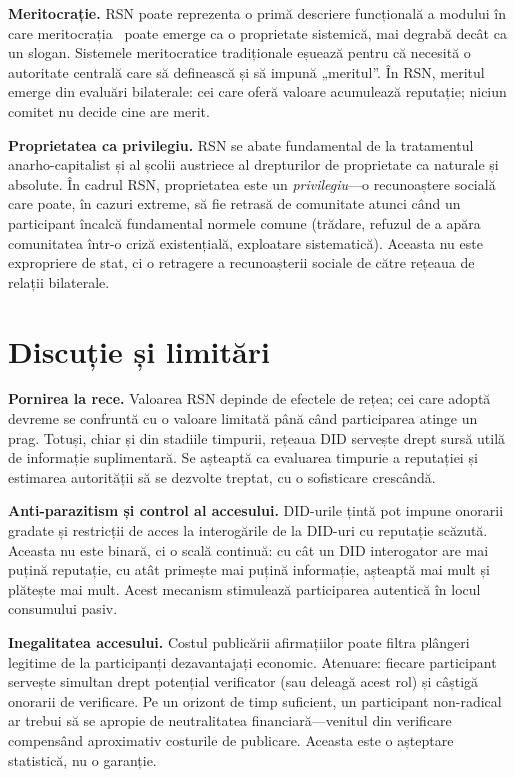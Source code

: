 \documentclass[11pt,a4paper,twocolumn]{article}
\begin{document}
\textbf{Meritocrație.} RSN poate reprezenta o primă descriere funcțională a modului în care meritocrația~\cite{young1958} poate emerge ca o proprietate sistemică, mai degrabă decât ca un slogan. Sistemele meritocratice tradiționale eșuează pentru că necesită o autoritate centrală care să definească și să impună „meritul”. În RSN, meritul emerge din evaluări bilaterale: cei care oferă valoare acumulează reputație; niciun comitet nu decide cine are merit.

\textbf{Proprietatea ca privilegiu.} RSN se abate fundamental de la tratamentul anarho-capitalist și al școlii austriece al drepturilor de proprietate ca naturale și absolute. În cadrul RSN, proprietatea este un \emph{privilegiu}---o recunoaștere socială care poate, în cazuri extreme, să fie retrasă de comunitate atunci când un participant încalcă fundamental normele comune (trădare, refuzul de a apăra comunitatea într-o criză existențială, exploatare sistematică). Aceasta nu este expropriere de stat, ci o retragere a recunoașterii sociale de către rețeaua de relații bilaterale.

\section{Discuție și limitări}

\textbf{Pornirea la rece.} Valoarea RSN depinde de efectele de rețea; cei care adoptă devreme se confruntă cu o valoare limitată până când participarea atinge un prag. Totuși, chiar și din stadiile timpurii, rețeaua DID servește drept sursă utilă de informație suplimentară. Se așteaptă ca evaluarea timpurie a reputației și estimarea autorității să se dezvolte treptat, cu o sofisticare crescândă.

\textbf{Anti-parazitism și control al accesului.} DID-urile țintă pot impune onorarii gradate și restricții de acces la interogările de la DID-uri cu reputație scăzută. Aceasta nu este binară, ci o scală continuă: cu cât un DID interogator are mai puțină reputație, cu atât primește mai puțină informație, așteaptă mai mult și plătește mai mult. Acest mecanism stimulează participarea autentică în locul consumului pasiv.

\textbf{Inegalitatea accesului.} Costul publicării afirmațiilor poate filtra plângeri legitime de la participanți dezavantajați economic. Atenuare: fiecare participant servește simultan drept potențial verificator (sau deleagă acest rol) și câștigă onorarii de verificare. Pe un orizont de timp suficient, un participant non-radical ar trebui să se apropie de neutralitatea financiară---venitul din verificare compensând aproximativ costurile de publicare. Aceasta este o așteptare statistică, nu o garanție.
\end{document}
